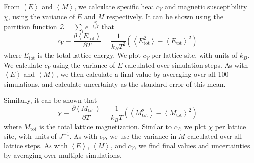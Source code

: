 \documentclass[letter,scriptaddress,twocolumn, prl,nofootinbib]{revtex4}
\newcommand{\submin}[1]{\left\langle #1 \right\rangle}
\begin{document}
From $\submin{E}$ and $\submin{M}$, we calculate specific heat $c_V$ and magnetic susceptibility $\chi$, using the variance of $E$ and $M$ respectively. It can be shown using the partition function $\mathcal{Z} = \sum_{i} e^{-\frac{E_i}{k_BT}}$ that
\begin{equation}
	\label{eq:cv}
	c_V \equiv \frac{\partial \submin{E_{\text{tot}}}}{\partial T} = \frac{1}{k_BT^2}(\submin{E_{\text{tot}}^2} - \submin{E_{\text{tot}}}^2)
\end{equation}
where $E_{\text{tot}}$ is the total lattice energy. We plot $c_V$ per lattice site, with units of $k_B$. We calculate $c_V$ using the variance of $E$ calculated over simulation steps. As with $\submin{E}$ and $\submin{M}$, we then calculate a final value by averaging over all 100 simulations, and calculate uncertainty as the standard error of this mean.

Similarly, it can be shown that
\begin{equation}
	\label{eq:chi}
	\chi \equiv \frac{\partial \submin{M_{\text{tot}}}}{\partial T} = \frac{1}{k_BT}(\submin{M_{\text{tot}}^2} - \submin{M_{\text{tot}}}^2)
\end{equation}
where $M_{\text{tot}}$ is the total lattice magnetization. Similar to $c_V$, we plot $\chi$ per lattice site, with units of $J^{-1}$. As with $c_V$, we use the variance in $M$ calculated over all lattice steps. As with $\submin{E}$, $\submin{M}$, and $c_V$, we find final values and uncertainties by averaging over multiple simulations.
\end{document}
